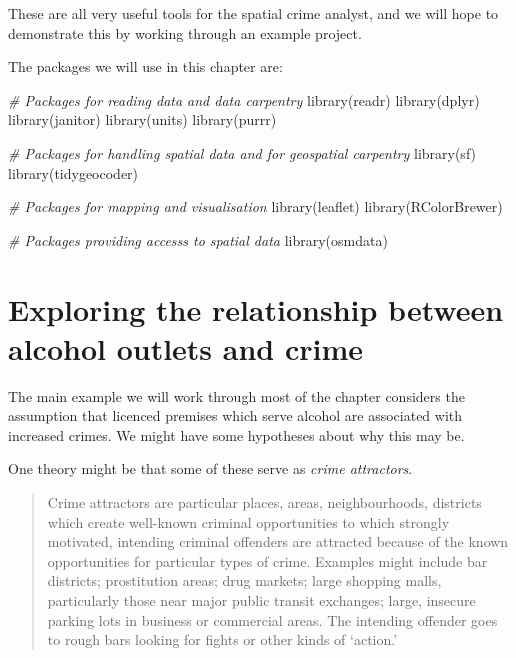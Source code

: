 \documentclass[
]{book}
\newenvironment{Shaded}{\begin{snugshade}}{\end{snugshade}}
\newcommand{\CommentTok}[1]{\textcolor[rgb]{0.56,0.35,0.01}{\textit{#1}}}
\newcommand{\FunctionTok}[1]{\textcolor[rgb]{0.00,0.00,0.00}{#1}}
\newcommand{\NormalTok}[1]{#1}
\begin{document}
These are all very useful tools for the spatial crime analyst, and we will hope to demonstrate this by working through an example project.

The packages we will use in this chapter are:

\begin{Shaded}
\begin{Highlighting}[]
\CommentTok{\# Packages for reading data and data carpentry}
\FunctionTok{library}\NormalTok{(readr)}
\FunctionTok{library}\NormalTok{(dplyr)}
\FunctionTok{library}\NormalTok{(janitor)}
\FunctionTok{library}\NormalTok{(units)}
\FunctionTok{library}\NormalTok{(purrr)}

\CommentTok{\# Packages for handling spatial data and for geospatial carpentry}
\FunctionTok{library}\NormalTok{(sf)}
\FunctionTok{library}\NormalTok{(tidygeocoder)}

\CommentTok{\# Packages for mapping and visualisation}
\FunctionTok{library}\NormalTok{(leaflet)}
\FunctionTok{library}\NormalTok{(RColorBrewer)}

\CommentTok{\# Packages providing accesss to spatial data}
\FunctionTok{library}\NormalTok{(osmdata)}
\end{Highlighting}
\end{Shaded}

\hypertarget{exploring-the-relationship-between-alcohol-outlets-and-crime}{%
\section{Exploring the relationship between alcohol outlets and crime}\label{exploring-the-relationship-between-alcohol-outlets-and-crime}}

The main example we will work through most of the chapter considers the assumption that licenced premises which serve alcohol are associated with increased crimes. We might have some hypotheses about why this may be.

One theory might be that some of these serve as \emph{crime attractors}.

\begin{quote}
Crime attractors are particular places, areas, neighbourhoods, districts which create well-known criminal opportunities to which strongly motivated, intending criminal offenders are attracted because of the known opportunities for particular types of crime. Examples might include bar districts; prostitution areas; drug markets; large shopping malls, particularly those near major public transit exchanges; large, insecure parking lots in business or commercial areas. The intending offender goes to rough bars looking for fights or other kinds of `action.'
\end{quote}
\end{document}
